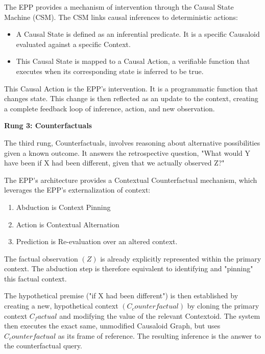 The EPP provides a mechanism of intervention through the Causal State Machine (CSM). 
The CSM  links causal inferences to deterministic actions:

\begin{itemize}
	\item A Causal State is defined as an inferential predicate. It is a specific Causaloid evaluated against a specific Context.
	\item This Causal State is mapped to a Causal Action, a verifiable function that executes when its corresponding state is inferred to be true.

\end{itemize}

This Causal Action is the EPP's intervention. It is a programmatic function that changes state. 
This change is then reflected as an update to the context, creating a complete feedback loop of inference, action, and new observation.

\textbf{Rung 3: Counterfactuals}

The third rung, Counterfactuals, involves reasoning about alternative possibilities given a known outcome. It answers the retrospective question, "What would Y have been if X had been different, given that we actually observed Z?"

The EPP's architecture provides a Contextual Counterfactual mechanism, which leverages the EPP's externalization of context:

\begin{enumerate}
	\item Abduction is Context Pinning
	\item Action is Contextual Alternation
	\item Prediction is Re-evaluation over an altered context. 
\end{enumerate}

The factual observation $(Z)$ is already explicitly represented within the primary context. 
The abduction step is therefore equivalent to identifying and "pinning" this factual context.

The hypothetical premise ("if X had been different") is then established by creating a new, hypothetical context $(C_counterfactual)$ by cloning the primary context $C_factual$ and modifying the value of the relevant Contextoid. The system then executes the exact same, unmodified Causaloid Graph, but uses $C_counterfactual$ as its frame of reference. The resulting inference is the answer to the counterfactual query. 


